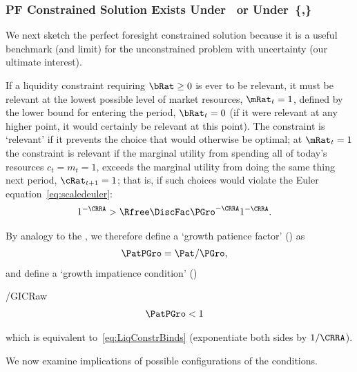 \documentclass[BufferStockTheory]{subfiles}
\begin{document}
\subsubsection{PF Constrained Solution Exists Under~\texorpdfstring{{\RIC}}{RIC} or Under~\texorpdfstring{\{\cncl{\RIC},\GICRaw\}}{RIC-Fails,GIC}}\label{subsec:PFCon}

We next sketch the perfect foresight constrained solution because it is a useful benchmark (and limit) for the unconstrained problem with uncertainty (our ultimate interest).

If a liquidity constraint requiring $\bRat \geq 0$ is ever to be relevant, it must be relevant at the lowest possible level of market resources, $\mRat_{t}=1$, defined by the lower bound for entering the period, $\bRat_{t}=0$ (if it were relevant at any higher point, it would certainly be relevant at this point).  The constraint is `relevant' if it prevents the choice that would otherwise be optimal; at $\mRat_{t}=1$ the constraint is relevant if the marginal utility from spending all of today's resources $c_{t}=m_{t}=1$, exceeds the marginal utility from doing the same thing next period, $\cRat_{t+1}=1$; that is, if such choices would violate the Euler equation~\eqref{eq:scaledeuler}:
\begin{align}
  1^{-\CRRA}  & > \Rfree \DiscFac \PGro^{-\CRRA}1^{-\CRRA}  \label{eq:LiqConstrBinds}.
\end{align}

\hypertarget{GPFRaw}{}
\hypertarget{GICRaw}{}
By analogy to the \RPF, we therefore define a `growth patience factor' (\GPFRaw) as
\begin{align}
  \PatPGro  & = {\Pat}/\PGro,  \label{eq:GPFRaw}
\end{align}
and define a `growth impatience condition' (\GICRaw)
\begin{verbatimwrite}{\EqDir/GICRaw}
  \begin{align}
    \PatPGro &  < 1   \label{eq:GICRaw}
  \end{align}
\end{verbatimwrite}

which is equivalent to~\eqref{eq:LiqConstrBinds} (exponentiate both
sides by $1/\CRRA$).

We now examine implications of possible configurations of the conditions.
\end{document}
